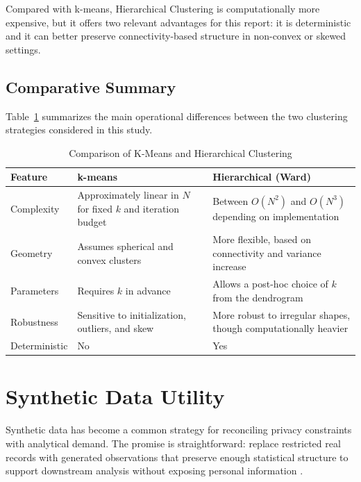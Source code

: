 Compared with k-means, Hierarchical Clustering is computationally more expensive, but it offers two relevant advantages for this report: it is deterministic and it can better preserve connectivity-based structure in non-convex or skewed settings.

\subsection{Comparative Summary}
Table~\ref{tab:kmeans_vs_hc} summarizes the main operational differences between the two clustering strategies considered in this study.

\begin{table}[H]
  \centering
  \caption{Comparison of K-Means and Hierarchical Clustering}
  \label{tab:kmeans_vs_hc}
  \renewcommand{\arraystretch}{1.2}
  \begin{tabular}{@{}lp{5.8cm}p{5.8cm}@{}}
    \toprule
    \textbf{Feature} & \textbf{k-means} & \textbf{Hierarchical (Ward)} \\ \midrule
    Complexity & Approximately linear in $N$ for fixed $k$ and iteration budget & Between $O(N^2)$ and $O(N^3)$ depending on implementation \\
    Geometry & Assumes spherical and convex clusters & More flexible, based on connectivity and variance increase \\
    Parameters & Requires $k$ in advance & Allows a post-hoc choice of $k$ from the dendrogram \\
    Robustness & Sensitive to initialization, outliers, and skew & More robust to irregular shapes, though computationally heavier \\
    Deterministic & No & Yes \\ \bottomrule
  \end{tabular}
\end{table}

\section{Synthetic Data Utility}
\label{sec:synthetic-data-utility}

Synthetic data has become a common strategy for reconciling privacy constraints with analytical demand. The promise is straightforward: replace restricted real records with generated observations that preserve enough statistical structure to support downstream analysis without exposing personal information \cite{nowok2016,qian2024}.

